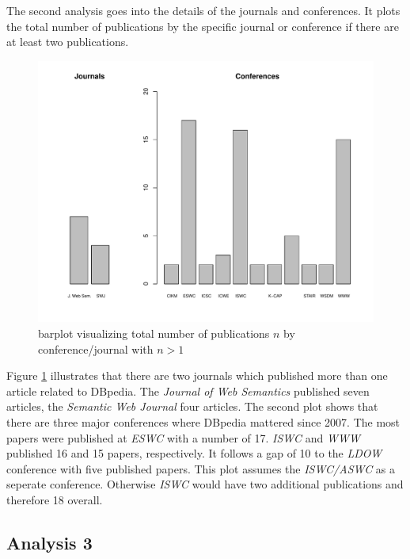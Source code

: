 \documentclass[english]{lni}
\begin{document}
   The second analysis goes into the details of the journals and conferences. It
   plots the total number of publications by the specific journal or conference
   if there are at least two publications.
   


\begin{figure}[htb]
\centering
\includegraphics[height=0.8\textwidth]{auswertung2.pdf}
\caption{\label{fig:auswertung2}barplot visualizing total number of publications $n$ by conference/journal with $n > 1$}
\end{figure}

   Figure \ref{fig:auswertung2} illustrates that there are two journals which published
   more than one article related to DBpedia. The \emph{Journal of Web Semantics}
   published seven articles, the \emph{Semantic Web Journal} four articles. The
   second plot shows that there are three major conferences where DBpedia
   mattered since 2007. The most papers were published at \emph{ESWC} with a number
   of 17. \emph{ISWC} and \emph{WWW} published 16 and 15 papers, respectively. It follows
   a gap of 10 to the \emph{LDOW} conference with five published papers. This plot
   assumes the \emph{ISWC/ASWC} as a seperate conference. Otherwise \emph{ISWC} would have
   two additional publications and therefore 18 overall.
   
\subsection{Analysis 3}
\label{sec-3-3}
\end{document}
